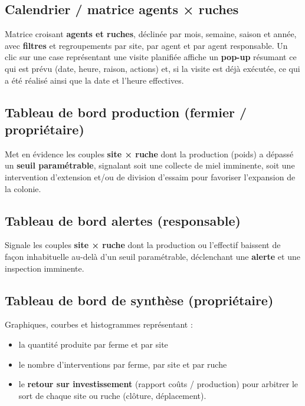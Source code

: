 \subsection{Calendrier / matrice agents × ruches}
Matrice croisant \textbf{agents et ruches}, déclinée par mois, semaine, saison
et année, avec \textbf{filtres} et regroupements par site, par agent et par agent
responsable. Un clic sur une case représentant une visite planifiée affiche un
\textbf{pop-up} résumant ce qui est prévu (date, heure, raison, actions) et, si
la visite est déjà exécutée, ce qui a été réalisé ainsi que la date et l'heure
effectives.

\subsection{Tableau de bord production (fermier / propriétaire)}
Met en évidence les couples \textbf{site × ruche} dont la production (poids) a
dépassé un \textbf{seuil paramétrable}, signalant soit une collecte de miel
imminente, soit une intervention d'extension et/ou de division d'essaim pour
favoriser l'expansion de la colonie.

\subsection{Tableau de bord alertes (responsable)}
Signale les couples \textbf{site × ruche} dont la production ou l'effectif
baissent de façon inhabituelle au-delà d'un seuil paramétrable, déclenchant une
\textbf{alerte} et une inspection imminente.

\subsection{Tableau de bord de synthèse (propriétaire)}
Graphiques, courbes et histogrammes représentant :
\begin{itemize}
  \item la quantité produite par ferme et par site
  \item le nombre d'interventions par ferme, par site et par ruche
  \item le \textbf{retour sur investissement} (rapport coûts / production) pour arbitrer
        le sort de chaque site ou ruche (clôture, déplacement).
\end{itemize}

